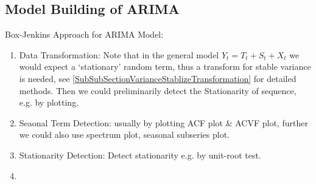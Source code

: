 \subsection{Model Building of ARIMA}

\begin{point}
    Box-Jenkins Approach for ARIMA Model:
\end{point}

    \begin{enumerate}[topsep=2pt,itemsep=0pt]
        \item Data Transformation: Note that in the general model $ Y_t=T_t+S_t+X_t $ we would expect a `stationary' random term, thus a transform for stable variance is needed, see \autoref{SubSubSectionVarianceStablizeTransformation} for detailed methods. Then we could preliminarily detect the Stationarity of sequence, e.g. by plotting.
        \item Seaonal Term Detection: usually by plotting ACF plot \& ACVF plot, further we could also use spectrum plot, seasonal subseries plot.
        \item Stationarity Detection: Detect stationarity e.g. by unit-root test.
        \item 
    \end{enumerate}
    
